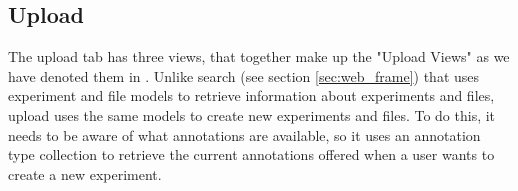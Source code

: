 \subsection{Upload}
The upload tab has three views, that together make up the "Upload Views" as we have denoted them in . Unlike search (see section \ref{sec:web_frame}) that uses experiment and file models to retrieve information about experiments and files, upload uses the same models to create new experiments and files. To do this, it needs to be aware of what annotations are available, so it uses an annotation type collection to retrieve the current annotations offered when a user wants to create a new experiment.
